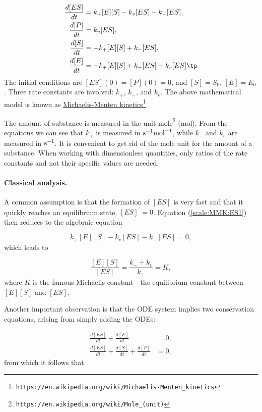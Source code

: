 \documentclass[graybox,envcountchap,sectrefs,final]{svmonodo}
\begin{document}
\begin{align}
\frac{d[ES]}{dt} &= k_+[E][S] - k_v[ES] - k_-[ES],
\label{scale:MMK:ES1}\\ 
\frac{d[P]}{dt} &= k_v[ES],
\label{scale:MMK:P1}\\ 
\frac{d[S]}{dt} &= -k_+[E][S] + k_-[ES],
\label{scale:MMK:S1}\\ 
\frac{d[E]}{dt} &= -k_+[E][S] + k_-[ES] + k_v[ES]\tp
\label{scale:MMK:E1}
\end{align}
The initial conditions are $[ES](0)=[P](0)=0$, and $[S]=S_0$, $[E]=E_0$.
Three rate constants are involved: $k_+$, $k_-$, and $k_v$.
The above mathematical model is known as \href{{https://en.wikipedia.org/wiki/Michaelis-Menten_kinetics}}{Michaelis-Menten kinetics}\footnote{\texttt{https://en.wikipedia.org/wiki/Michaelis-Menten\_kinetics}}.

The amount of substance is measured in the unit \href{{https://en.wikipedia.org/wiki/Mole_(unit)}}{mole}\footnote{\texttt{https://en.wikipedia.org/wiki/Mole\_(unit)}} (mol). From the equations we can see that
$k_+$ is measured in $\hbox{s}^{-1}\hbox{mol}^{-1}$, while $k_-$ and
$k_v$ are measured in $\hbox{s}^{-1}$. It is convenient to get rid of
the mole unit for the amount of a substance. When working with
dimensionless quantities, only ratios of the rate constants and not their
specific values are needed.

\paragraph{Classical analysis.}
A common assumption is that the formation of $[ES]$ is very fast and that
it quickly reaches an equilibrium state, $[ES]^{\prime}=0$. Equation
(\ref{scale:MMK:ES1}) then reduces to the algebraic equation

\[ k_+[E][S] - k_v[ES] - k_-[ES] = 0, \]
which leads to

\begin{equation}
\frac{[E][S]}{[ES]} = \frac{k_- + k_v}{k_+} = K,
\label{scale:MMK:K}
\end{equation}
where $K$ is the famous Michaelis constant - the equilibrium constant
between $[E][S]$ and $[ES]$.

Another important observation is that the ODE system implies
two conservation equations, arising from simply adding the ODEs:

\begin{align}
\frac{d[ES]}{dt} + \frac{d[E]}{dt} & =0,\\ 
\frac{d[ES]}{dt} + \frac{d[S]}{dt} + \frac{d[P]}{dt} &= 0,
\end{align}
from which it follows that
\end{document}
